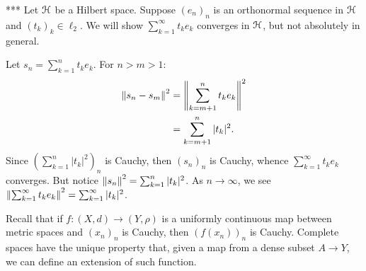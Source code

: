     \begin{example}***
        Let $\mathcal{H}$ be a Hilbert space. Suppose $(e_n)_n$ is an orthonormal sequence in $\mathcal{H}$ and $(t_k)_k \in \ell_2$. We will show $\sum_{k = 1}^\infty t_k e_k$ converges in $\mathcal{H}$, but not absolutely in general.

        Let $s_n = \sum_{k = 1}^n t_k e_k$. For $n>m > 1$:
            \begin{equation*}
            \begin{split}
                \left\lVert s_n - s_m \right\rVert^2 
                & = \left\lVert \sum_{k = m+1}^n t_k e_k \right\rVert^2 \\
                & = \sum_{k = m+1}^n |t_k|^2.
            \end{split}
            \end{equation*}
        Since $ \left( \sum_{k = 1}^n |t_k|^2 \right)_n$ is Cauchy, then $(s_n)_n$ is Cauchy, whence $\sum_{k = 1}^\infty t_k e_k$ converges. But notice $\left\lVert s_n \right\rVert^2 = \sum_{k = 1}^n |t_k|^2$. As $n \rightarrow \infty$, we see $\left\lVert \sum_{k = 1}^\infty t_k e_k \right\rVert^2 = \sum_{k = 1}^\infty |t_k|^2$.
    \end{example}

    \begin{center}
    \end{center}

    Recall that if $f:(X,d) \rightarrow (Y,\rho)$ is a uniformly continuous map between metric spaces and $(x_n)_n$ is Cauchy, then $(f(x_n))_n$ is Cauchy. Complete spaces have the unique property that, given a map from a dense subset $A \rightarrow Y$, we can define an extension of such function.

